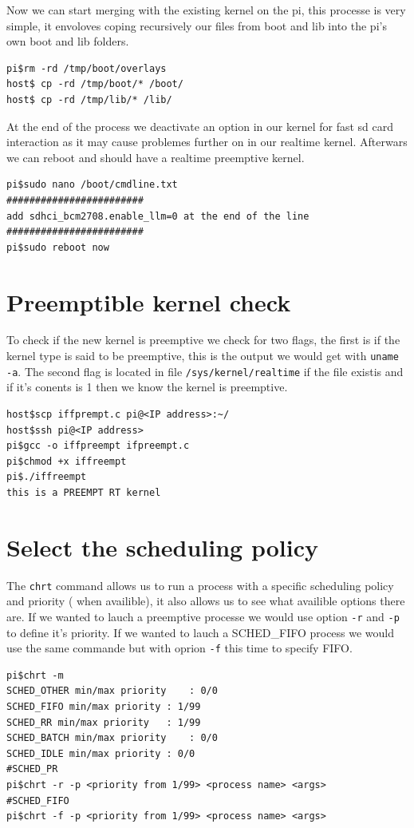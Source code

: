 \documentclass[a4paper,oneside,onecolumn]{article}
\newcommand{\code}[1]{\colorbox{codegray}{\texttt{#1}}}
\begin{document}
Now we can start merging with the existing kernel on the pi, this processe is very simple, it envoloves coping recursively our files from boot and lib into the pi's own boot and lib folders.
\begin{lstlisting}
pi$rm -rd /tmp/boot/overlays
host$ cp -rd /tmp/boot/* /boot/
host$ cp -rd /tmp/lib/* /lib/
\end{lstlisting}
At the end of the process we deactivate an option in our kernel for fast sd card interaction as it may cause problemes further on in our realtime kernel. Afterwars we can reboot and should have a realtime preemptive kernel.\newline
\begin{lstlisting}
pi$sudo nano /boot/cmdline.txt 
########################
add sdhci_bcm2708.enable_llm=0 at the end of the line
########################
pi$sudo reboot now
\end{lstlisting}

\section{Preemptible kernel check}
To check if the new kernel is preemptive we check for two flags, the first is if the kernel type is said to be preemptive, this is the output we would get with \code{uname -a}. The second flag is located in file \code{/sys/kernel/realtime} if the file existis and if it's conents is 1 then we know the kernel is preemptive.
\begin{lstlisting}
host$scp iffprempt.c pi@<IP address>:~/
host$ssh pi@<IP address>
pi$gcc -o iffpreempt ifpreempt.c
pi$chmod +x iffreempt
pi$./iffreempt
this is a PREEMPT RT kernel
\end{lstlisting}
\section{Select the scheduling policy}
The \code{chrt} command allows us to run a process with a specific scheduling policy and priority ( when availible), it also allows us to see what availible options there are. If we wanted to lauch a preemptive processe we would use option \code{-r} and \code{-p} to define it's priority.\newline
If we wanted to lauch a SCHED\_FIFO process we would use the same commande but with oprion \code{-f} this time to specify FIFO.
\begin{lstlisting}
pi$chrt -m
SCHED_OTHER min/max priority	: 0/0
SCHED_FIFO min/max priority	: 1/99
SCHED_RR min/max priority	: 1/99
SCHED_BATCH min/max priority	: 0/0
SCHED_IDLE min/max priority	: 0/0
#SCHED_PR
pi$chrt -r -p <priority from 1/99> <process name> <args>
#SCHED_FIFO
pi$chrt -f -p <priority from 1/99> <process name> <args>
\end{lstlisting}
\end{document}
